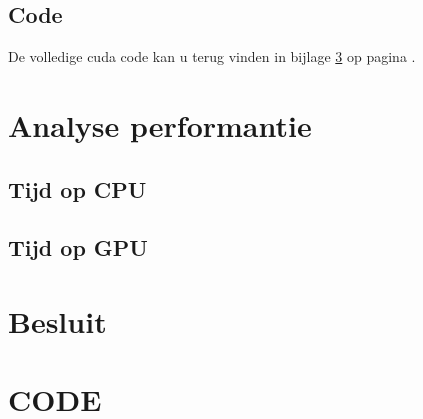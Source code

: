 \documentclass[twoside,a4paper]{article}
\begin{document}
\subsection{Code}
De volledige cuda code kan u terug vinden in bijlage \ref{code} op pagina \pageref{code}.

\section{Analyse performantie}

\subsection{Tijd op CPU}

\subsection{Tijd op GPU}


\section{Besluit}



\newpage
\appendix
\section{CODE}
\label{code}
\inputminted[linenos=true, breaklines=true]{cuda}{template.cu}

\clearpage



\end{document}
